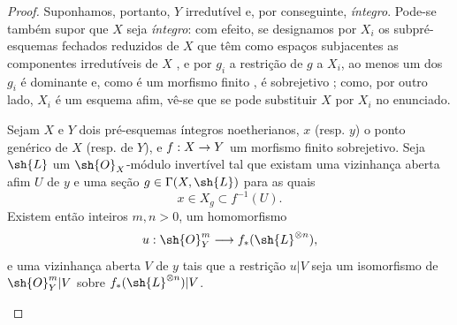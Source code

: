 \documentclass[oneside,10pt]{amsart}
\makeatletter
\newcommand{\ega@arrow}[2]{\mathchoice{#1}{#2}{#2}{#2}}
\renewcommand{\to}{\ega@arrow{\longrightarrow}{\rightarrow}}
\newcommand{\oldpage}[2][]{\marginnote{\normalfont\footnotesize\textbf{#1}~|~#2}\ignorespaces}
\let\EGAOriginalLabel\label
\renewcommand{\label}[1]{\phantomsection\EGAOriginalLabel{#1}}
\makeatother
\begin{document}
\begin{proof}
Suponhamos, portanto, $Y$ irredutível e, por conseguinte, \emph{íntegro}.
Pode-se também supor que $X$ seja \emph{íntegro}:
com efeito, se designamos por $X_i$ os subpré-esquemas fechados reduzidos de $X$ que têm como espaços subjacentes as componentes irredutíveis de $X$ , e por $g_i$ a restrição de $g$ a $X_i$, ao menos um dos $g_i$ é dominante e, como é um morfismo finito , é sobrejetivo ;
como, por outro lado, $X_i$ é um esquema afim, vê-se que se pode substituir $X$ por $X_i$ no enunciado.

\begin{lemma}[6.7.1.1]
\label{II.6.7.1.1}
Sejam $X$ e $Y$ dois pré-esquemas íntegros noetherianos, $x$ (resp. $y$) o ponto genérico de $X$ (resp. de $Y$), e $f:X\to Y$ um morfismo finito sobrejetivo.
Seja $\sh{L}$ um $\sh{O}_X$-módulo invertível tal que existam uma vizinhança aberta afim $U$ de $y$ e uma seção $g\in\Gamma(X,\sh{L})$ para as quais
\oldpage[II]{137}
\[
  x\in X_g\subset f^{-1}(U).
\]
Existem então inteiros $m,n>0$, um homomorfismo
\[
  u:\sh{O}_Y^m\to f_*(\sh{L}^{\otimes n}),
\]
e uma vizinhança aberta $V$ de $y$ tais que a restrição $u|V$ seja um isomorfismo de $\sh{O}_Y^m|V$ sobre $f_*(\sh{L}^{\otimes n})|V$.
\end{lemma}


\end{proof}
\end{document}
